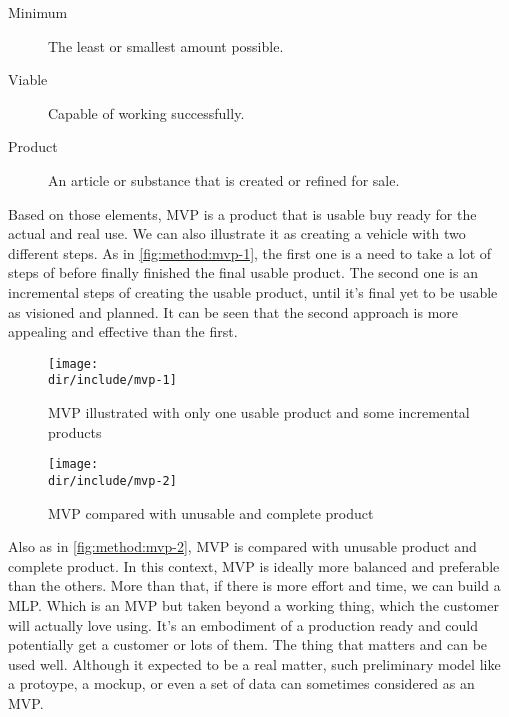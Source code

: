 \begin{description}
  \item[Minimum] The least or smallest amount possible.
  \item[Viable] Capable of working successfully.
  \item[Product] An article or substance that is created or refined for sale.
\end{description}

Based on those elements, \ac{MVP} is a product that is usable buy ready for the actual and real use.
We can also illustrate it as creating a vehicle with two different steps.
As in \autoref{fig:method:mvp-1}, the first one is a need to take a lot of steps of before finally finished the final usable product.
The second one is an incremental steps of creating the usable product, until it's final yet to be usable as visioned and planned.
It can be seen that the second approach is more appealing and effective than the first.

\begin{figure}[htb]
    \centering
    \texttt{[image: \\dir/include/mvp-1]}
    \caption[MVP illustrated]{MVP illustrated with only one usable product and some incremental products~\autocite{Mercury2014MVP}}
    \label{fig:method:mvp-1}
\end{figure}

\begin{figure}[htb]
    \centering
    \texttt{[image: \\dir/include/mvp-2]}
    \caption[MVP compared]{MVP compared with unusable and complete product~\autocite{Mercury2014MVP}}
    \label{fig:method:mvp-2}
\end{figure}

Also as in \autoref{fig:method:mvp-2}, \ac{MVP} is compared with unusable product and complete product.
In this context, \ac{MVP} is ideally more balanced and preferable than the others.
More than that, if there is more effort and time, we can build a \ac{MLP}.
Which is an \ac{MVP} but taken beyond a working thing, which the customer will actually love using.
It's an embodiment of a production ready and could potentially get a customer or lots of them.
The thing that matters and can be used well.
Although it expected to be a real matter, such preliminary model like a protoype, a mockup, or even a set of data can sometimes considered as an \ac{MVP}.
